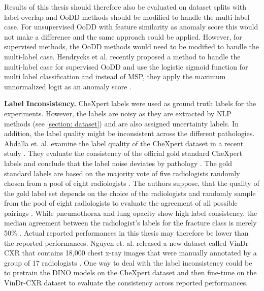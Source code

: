 Results of this thesis should therefore also be evaluated on dataset splits with label overlap and OoDD methods should be modified to handle the multi-label case.
For unsupervised OoDD with feature similarity as anomaly score this would not make a difference and the same approach could be applied.
However, for supervised methods, the OoDD methods would need to be modified to handle the multi-label case.
Hendrycks et al. recently proposed a method to handle the multi-label case for supervised OoDD and use the logistic sigmoid function for multi label classification and instead of MSP, they apply the maximum unnormalized logit as an anomaly score \citep{Hendrycks2022}.
\par
\textbf{Label Inconsistency.}
CheXpert labels were used as ground truth labels for the experiments.
However, the labels are noisy as they are extracted by NLP methods (see \ref{section: dataset}) and are also assigned uncertainty labels.
In addition, the label quality might be inconsistent across the different pathologies.
Abdalla et. al. examine the label quality of the CheXpert dataset in a recent study \citep{Abdalla2023}.
They evaluate the consistency of the official gold standard CheXpert labels and conclude that the label noise deviates by pathology \citep{Abdalla2023}.
The gold standard labels are based on the majority vote of five radiologists randomly chosen from a pool of eight radiologists \citep{Irvin2019}.
The authors suppose, that the quality of the gold label set depends on the choice of the radiologists and randomly sample from the pool of eight radiologists to evaluate the agreement of all possible pairings \citep{Abdalla2023}. 
While pneumothorax and lung opacity show high label consistency, the median agreement between the radiologist's labels for the fracture class is merely 50\% \citep{Abdalla2023}.
Actual reported performances in this thesis may therefore be lower than the reported performances.
Nguyen et. al. released a new dataset called VinDr-CXR that contains 18,000 chest x-ray images that were manually annotated by a group of 17 radiologists \citep{Nguyen2022}.
One way to deal with the label inconsistency could be to pretrain the DINO models on the CheXpert dataset and then fine-tune on the VinDr-CXR dataset to evaluate the consistency across reported performances.
\par
